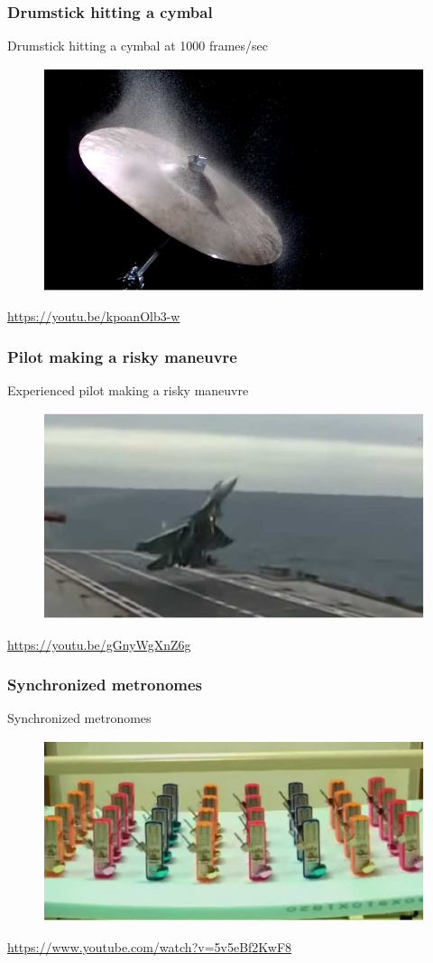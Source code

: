 \begin{frame}
	\frametitle{Drumstick hitting a cymbal}
	Drumstick hitting a cymbal at 1000 frames/sec
	\begin{figure}
		\includegraphics[scale=.6]{cymbal}
	\end{figure}
	\url{https://youtu.be/kpoanOlb3-w}
\end{frame}

\begin{frame}
	\frametitle{Pilot making a risky maneuvre}
	Experienced pilot making a risky maneuvre
	\begin{figure}
		\includegraphics[scale=0.7]{risky_maneuvre}
	\end{figure}
	\url{https://youtu.be/gGnyWgXnZ6g}
\end{frame}

\begin{frame}
	\frametitle{Synchronized metronomes}
	Synchronized metronomes
	\begin{figure}
		\includegraphics[scale=0.8]{synchronized_metronomes}
	\end{figure}
	\url{https://www.youtube.com/watch?v=5v5eBf2KwF8}
\end{frame}

